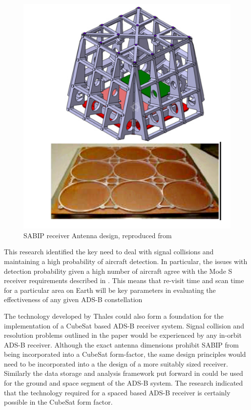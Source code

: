 \begin{figure}[htb]
	\centering
	\includegraphics[scale = 0.8]{Pictures/sapid_spotbeams.png}
	
	\caption[SAPID receiver Antenna design]{SABIP receiver Antenna design, reproduced from \cite{Blomenhofer2012}}
	\label{fig:sapid_spotbeams}
\end{figure}

This research identified the key need to deal with signal collisions and maintaining a high probability of aircraft detection. In particular, the issues with detection probability given a high number of aircraft agree with the Mode S receiver requirements described in \cite{Orlando2001}. This means that re-visit time and scan time for a particular area on Earth will be key parameters in evaluating the effectiveness of any given ADS-B constellation

The technology developed by Thales could also form a foundation for the implementation of a CubeSat based ADS-B receiver system. Signal collision and resolution problems outlined in the paper would be experienced by any in-orbit ADS-B receiver. Although the exact antenna dimensions prohibit SABIP from being incorporated into a CubeSat form-factor, the same design principles would need to be incorporated into a the design of a more suitably sized receiver. Similarly the data storage and analysis framework put forward in \cite{Blomenhofer2012} could be used for the ground and space segment of the ADS-B system. The research indicated that the technology required for a spaced based ADS-B receiver is certainly possible in the CubeSat form factor.


